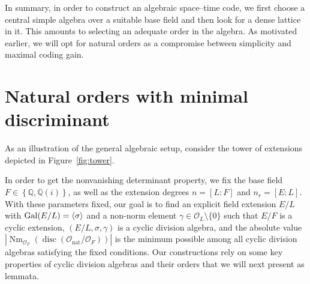 \documentclass[smallextended]{svjour3}
\newcommand{\mcf}{\Or_{F}}
\newcommand{\mcl}{\Or_{L}}
\newcommand{\G}{{\rm Gal}}
\newcommand{\Or}{\mathcal{O}}
\DeclareMathOperator{\Nm}{Nm}
\DeclareMathOperator{\nat}{nat}
\DeclareMathOperator{\disc}{disc}
\DeclareMathOperator{\nr}{nr}
\DeclareMathOperator{\tr}{tr}
\begin{document}
In summary, in order to construct an algebraic space--time code, we first choose a central simple algebra over a suitable base field and then look for a dense lattice in it. This amounts to selecting an adequate order in the algebra. As motivated earlier, we will opt for natural orders as a compromise between simplicity and maximal coding gain. 



\section{Natural orders with minimal discriminant}
\label{sec:nat_orders}

As an illustration of the general algebraic setup, consider the tower of extensions depicted in Figure~\ref{fig:tower}. 

In order to get the nonvanishing determinant property, we fix the base field $F \in \left\{\mathbb{Q},\mathbb{Q}(i)\right\}$, as well as the extension degrees $n = [L:F]$ and $n_r = [E:L]$. With these parameters fixed, our goal is to find an explicit field extension $E/L$ with $\G(E/L) = \langle \sigma \rangle$ and a non-norm element $\gamma \in \mcl\setminus\{0\}$ such that $E/F$ is a cyclic extension, 
$(E/L,\sigma,\gamma)$ is a cyclic division algebra,
and the absolute value $|\Nm_{\Or_F}(\disc(\Or_{\nat}/\mcf))|$ is the minimum possible among all cyclic division algebras satisfying the fixed conditions. 
Our constructions rely on some key properties of cyclic division algebras and their orders that we will next present as lemmata. 

\end{document}
